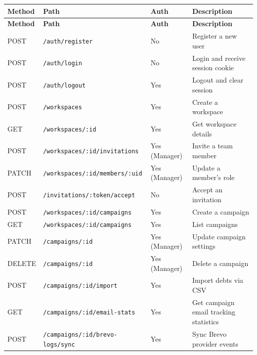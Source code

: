 \documentclass[12pt,a4paper]{report}
\begin{document}
\savenotes
\begin{longtable}{|p{1.4cm}|p{5.8cm}|p{2.8cm}|p{3.8cm}|}
  \hline
  \textbf{Method} & \textbf{Path} & \textbf{Auth} & \textbf{Description} \\
  \hline
  \endfirsthead
  \hline
  \textbf{Method} & \textbf{Path} & \textbf{Auth} & \textbf{Description} \\
  \hline
  \endhead
  POST  & \texttt{/auth/register}                    & No             & Register a new user \\
  \hline
  POST  & \texttt{/auth/login}                       & No             & Login and receive session cookie \\
  \hline
  POST  & \texttt{/auth/logout}                      & Yes            & Logout and clear session \\
  \hline
  POST  & \texttt{/workspaces}                       & Yes            & Create a workspace \\
  \hline
  GET   & \texttt{/workspaces/:id}                   & Yes            & Get workspace details \\
  \hline
  POST  & \texttt{/workspaces/:id/invitations}       & Yes (Manager)  & Invite a team member \\
  \hline
  PATCH & \texttt{/workspaces/:id/members/:uid}      & Yes (Manager)  & Update a member's role \\
  \hline
  POST  & \texttt{/invitations/:token/accept}        & No             & Accept an invitation \\
  \hline
  POST  & \texttt{/workspaces/:id/campaigns}         & Yes            & Create a campaign \\
  \hline
  GET   & \texttt{/workspaces/:id/campaigns}         & Yes            & List campaigns \\
  \hline
  PATCH & \texttt{/campaigns/:id}                    & Yes (Manager)  & Update campaign settings \\
  \hline
  DELETE & \texttt{/campaigns/:id}                   & Yes (Manager)  & Delete a campaign \\
  \hline
  POST  & \texttt{/campaigns/:id/import}             & Yes            & Import debts via CSV \\
  \hline
  GET   & \texttt{/campaigns/:id/email-stats}        & Yes            & Get campaign email tracking statistics \\
  \hline
  POST  & \texttt{/campaigns/:id/brevo-logs/sync}    & Yes            & Sync Brevo provider events \\

\end{longtable}
\end{document}
